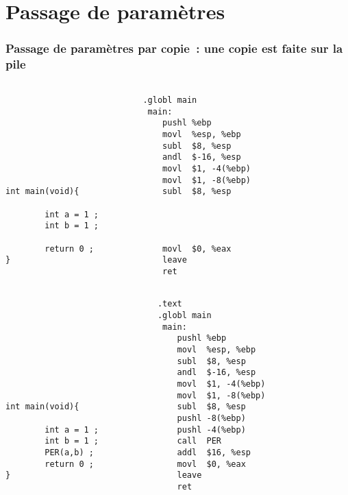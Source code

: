   \section{Passage de param\`etres}
\begin{frame}[fragile]
 \frametitle{Passage de param\`etres par copie~: une copie est faite sur la pile}%
\begin{verbatim}
                                                            
                            .globl main   
                             main:         
                                pushl %ebp     
                                movl  %esp, %ebp    
                                subl  $8, %esp  
                                andl  $-16, %esp    
                                movl  $1, -4(%ebp)  
                                movl  $1, -8(%ebp)  
int main(void){                 subl  $8, %esp  
                             
        int a = 1 ;          
        int b = 1 ;          
                             
        return 0 ;              movl  $0, %eax  
}                               leave           
                                ret 


\end{verbatim}
\end{frame}
\begin{frame}[fragile]
\begin{verbatim}
                               .text                                              
                               .globl main   
                                main:         
                                   pushl %ebp     
                                   movl  %esp, %ebp    
                                   subl  $8, %esp  
                                   andl  $-16, %esp    
                                   movl  $1, -4(%ebp)  
                                   movl  $1, -8(%ebp)  
int main(void){                    subl  $8, %esp  
                                   pushl -8(%ebp)  
        int a = 1 ;                pushl -4(%ebp)  
        int b = 1 ;                call  PER       
        PER(a,b) ;                 addl  $16, %esp 
        return 0 ;                 movl  $0, %eax  
}                                  leave           
                                   ret 
\end{verbatim}
\end{frame}
